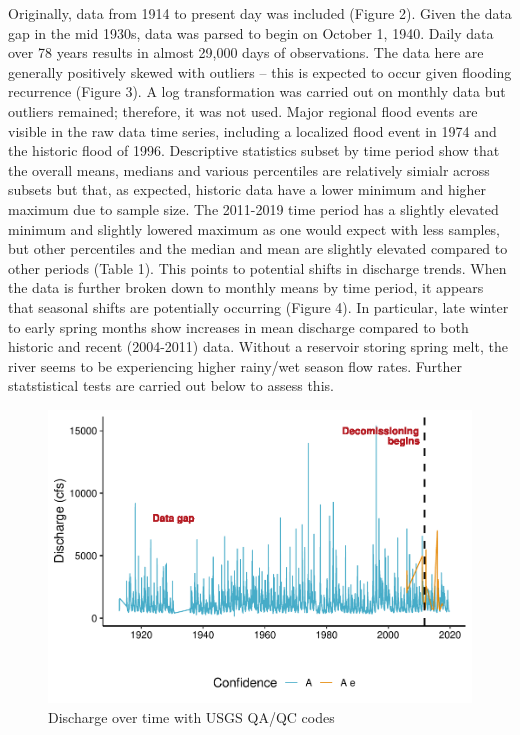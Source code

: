 \documentclass[
  12pt,
]{article}
\begin{document}
Originally, data from 1914 to present day was included (Figure 2). Given
the data gap in the mid 1930s, data was parsed to begin on October 1,
1940. Daily data over 78 years results in almost 29,000 days of
observations. The data here are generally positively skewed with
outliers -- this is expected to occur given flooding recurrence (Figure
3). A log transformation was carried out on monthly data but outliers
remained; therefore, it was not used. Major regional flood events are
visible in the raw data time series, including a localized flood event
in 1974 and the historic flood of 1996. Descriptive statistics subset by
time period show that the overall means, medians and various percentiles
are relatively simialr across subsets but that, as expected, historic
data have a lower minimum and higher maximum due to sample size. The
2011-2019 time period has a slightly elevated minimum and slightly
lowered maximum as one would expect with less samples, but other
percentiles and the median and mean are slightly elevated compared to
other periods (Table 1). This points to potential shifts in discharge
trends. When the data is further broken down to monthly means by time
period, it appears that seasonal shifts are potentially occurring
(Figure 4). In particular, late winter to early spring months show
increases in mean discharge compared to both historic and recent
(2004-2011) data. Without a reservoir storing spring melt, the river
seems to be experiencing higher rainy/wet season flow rates. Further
statstistical tests are carried out below to assess this.

\begin{figure}
\centering
\includegraphics{WhiteSalmon_WriteUp_files/figure-latex/fig2-1.pdf}
\caption{Discharge over time with USGS QA/QC codes}
\end{figure}
\end{document}
